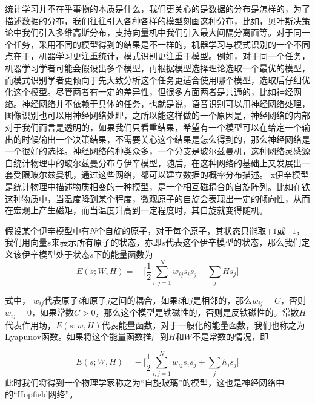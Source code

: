 \label{chapter:RBM}
统计学习并不在乎事物的本质是什么，我们更关心的是数据的分布是怎样的，为了描述数据的分布，我们往往引入各种各样的模型刻画这种分布，比如，贝叶斯决策论中我们引入多维高斯分布，支持向量机中我们引入最大间隔分离面等。对于同一个任务，采用不同的模型得到的结果是不一样的，机器学习与模式识别的一个不同点在于，机器学习更注重统计，模式识别更注重于模型。例如，对于同一个任务，机器学习学者可能会假设出多个模型，再根据模型选择理论选取一个最优的模型，而模式识别学者更倾向于先大致分析这个任务更适合使用哪个模型，选取后仔细优化这个模型。尽管两者有一定的差异性，但很多方面两者是共通的，比如神经网络。神经网络并不依赖于具体的任务，也就是说，语音识别可以用神经网络处理，图像识别也可以用神经网络处理，之所以能这样做的一个原因是，神经网络的内部对于我们而言是透明的，如果我们只看重结果，希望有一个模型可以在给定一个输出的时候输出一个决策结果，不需要关心这个结果是怎么得到的，那么神经网络是一个很好的选择。神经网络的种类众多，一个分支是玻尔兹曼机，这种网络灵感源自统计物理中的玻尔兹曼分布与伊辛模型，随后，在这种网络的基础上又发展出一套受限玻尔兹曼机，通过这些网络，都可以建立数据的概率分布描述。
x伊辛模型是统计物理中描述物质相变的一种模型，是一个相互磁耦合的自旋阵列。比如在铁这种物质中，当温度降到某个程度，微观原子的自旋会表现出一定的倾向性，从而在宏观上产生磁矩，而当温度升高到一定程度时，其自旋就变得随机。

假设某个伊辛模型中有$N$个自旋的原子，对于每个原子，其状态只能取$+1$或$-1$，我们用向量$s$来表示所有原子的状态，亦即$s$代表这个伊辛模型的状态，那么我们定义该伊辛模型处于状态$s$下的能量函数为
\begin{equation}
E(s; W, H) = -~\Big[\frac{1}{2} \sum\limits_{i, j = 1}^{N} w_{ij}s_is_j + \sum\limits_j Hs_j\Big]
\end{equation}

式中， $w_{ij}$代表原子$i$和原子$j$之间的耦合，如果$i$和$j$是相邻的，那么$w_{ij} = C$，否则$w_{ij} = 0$，如果常数$C>0$，那么这个模型是铁磁性的，否则是反铁磁性的。常数$H$代表作用场，$E(s; w, H)$代表能量函数，对于一般化的能量函数，我们也称之为Lyapunov函数。如果将这个能量函数推广到$H$和$W$不是常数的情况，即

\begin{equation}\label{eq:energyFunction}
E(s; W, H) = -~\Big[\frac{1}{2} \sum\limits_{i, j = 1}^{N} w_{ij}s_is_j + \sum\limits_j h_js_j\Big]
\end{equation}
此时我们将得到一个物理学家称之为“自旋玻璃”的模型，这也是神经网络中的“Hopfield网络”。

